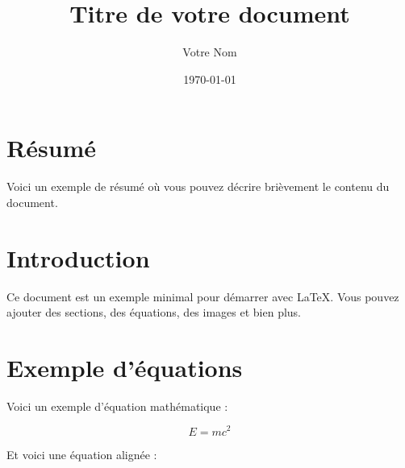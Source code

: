 \documentclass[a4paper,12pt]{article}
\title{Titre de votre document}
\author{Votre Nom}
\date{\today}
\begin{document}
\maketitle

\section*{Résumé}
Voici un exemple de résumé où vous pouvez décrire brièvement le contenu du document.

\section{Introduction}
Ce document est un exemple minimal pour démarrer avec LaTeX. Vous pouvez ajouter des sections, des équations, des images et bien plus.

\section{Exemple d'équations}
Voici un exemple d'équation mathématique :

\[
E = mc^2
\]

Et voici une équation alignée :
\end{document}
